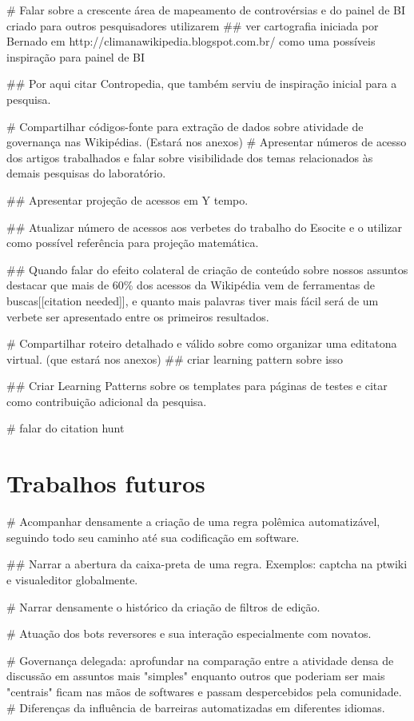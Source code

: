 # Falar sobre a crescente área de mapeamento de controvérsias e do painel de BI criado para outros pesquisadores utilizarem
## ver cartografia iniciada por Bernado em
http://climanawikipedia.blogspot.com.br/ como uma possíveis inspiração para painel de BI

## Por aqui citar Contropedia, que também serviu de inspiração inicial para a pesquisa.

# Compartilhar códigos-fonte para extração de dados sobre atividade de governança nas Wikipédias. (Estará nos anexos)
# Apresentar números de acesso dos artigos trabalhados e falar sobre visibilidade dos temas relacionados às demais pesquisas do laboratório.

## Apresentar projeção de acessos em Y tempo.

## Atualizar número de acessos aos verbetes do trabalho do Esocite e o utilizar como possível referência para projeção matemática.

## Quando falar do efeito colateral de criação de conteúdo sobre nossos assuntos destacar que mais de 60\% dos acessos da Wikipédia vem de ferramentas de buscas[[citation needed]], e quanto mais palavras tiver mais fácil será de um verbete ser apresentado entre os primeiros resultados.

# Compartilhar roteiro detalhado e válido sobre como organizar uma editatona virtual. (que estará nos anexos) ## criar learning pattern sobre isso

## Criar Learning Patterns sobre os templates para páginas de testes e citar como contribuição adicional da pesquisa.

# falar do citation hunt

\section{Trabalhos futuros}

# Acompanhar densamente a criação de uma regra polêmica automatizável, seguindo todo seu caminho até sua codificação em software.

## Narrar a abertura da caixa-preta de uma regra. Exemplos: captcha na ptwiki e visualeditor globalmente.

# Narrar densamente o histórico da criação de filtros de edição.

# Atuação dos bots reversores e sua interação especialmente com novatos.

# Governança delegada: aprofundar na comparação entre a atividade densa de discussão em assuntos mais "simples" enquanto outros que poderiam ser mais "centrais" ficam nas mãos de softwares e passam despercebidos pela comunidade.
# Diferenças da influência de barreiras automatizadas em diferentes idiomas.

